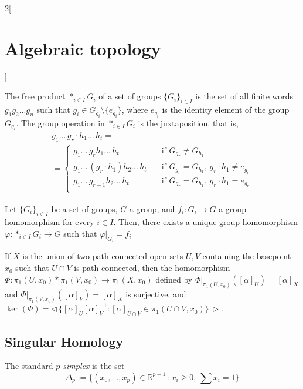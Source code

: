\documentclass[../../../main_math.tex]{subfiles}
\begin{document}
\begin{multicols}{2}[\section{Algebraic topology}]
	\begin{definition}
		The free product $*_{i\in I}G_i$ of a set of groups $\{G_i\}_{i\in I}$ is the set of all finite words $g_1g_2...g_n$ such that $g_i\in G_{g_i}\setminus \{e_{g_i}\}$, where $e_{g_i}$ is the identity element of the group $G_{g_i}$.  The group operation in $*_{i\in I}G_i$ is the juxtaposition, that is, 
		\begin{multline*}
			g_1...\,g_r \cdot h_1...\,h_t=\\
			= \begin{cases}
				g_1...\,g_rh_1...\,h_t & \quad\text{if  } G_{g_r}\neq G_{h_1} \\
				g_1...\,(g_r\cdot h_1)h_2...\,h_t  & \quad\text{if } G_{g_r} = G_{h_1} \text{,  } g_r\cdot h_1 \neq e_{g_r}\\
				g_1...\,g_{r-1}h_2...\,h_t & \quad\text{if } G_{g_r} = G_{h_1} \text{,  } g_r\cdot h_1 = e_{g_r}\\
			\end{cases}
		\end{multline*}
	\end{definition}

	\begin{proposition}
		Let $\{G_i\}_{i\in I}$ be a set of groups, $G$ a group, and $f_i: G_i \to G$ a group homomorphism for every $i\in I$. Then, there exists a unique group homomorphism $\varphi: *_{i\in I}G_i \to G$ such that $\left.\varphi \right|_{G_i}=f_i$
	\end{proposition}

	\begin{theorem}
		If $X$ is the union of two path-connected open sets $U, V$ containing the basepoint $x_0$ such that $U\cap V$ is path-connected, then the homomorphism $\Phi : \pi_1(U, x_0)*\pi_1(V, x_0)\to \pi_1(X, x_0)$ defined by $\left.\Phi \right|_{\pi_1(U, x_0)}([\alpha]_U)=[\alpha]_X$ and  $\left.\Phi \right|_{\pi_1(V, x_0)}([\alpha]_V)=[\alpha]_X$ is surjective, and $\ker(\Phi)=\triangleleft\,\{[\alpha]_U[\alpha]_V^{-1} : [\alpha]_{U\cap V} \in \pi_1(U\cap V, x_0)\}\,\triangleright$.
	\end{theorem}

	\subsection{Singular Homology}
	
	\begin{definition}
		The standard $p$\emph{-simplex} is the set $$\Delta_p:=\{(x_0, ... , x_p)\in \mathbb{R}^{p+1}\ : x_i\geq0, \, \sum x_i =1\}$$
	\end{definition}
	

\end{multicols}
\end{document}
